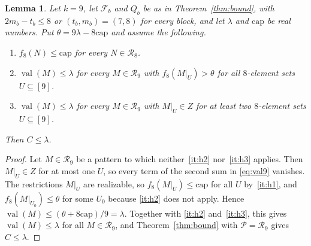 \documentclass[11pt]{amsart}
\newtheorem{lemma}[theorem]{Lemma}
\theoremstyle{definition}
\theoremstyle{remark}
\numberwithin{equation}{section}
\newcommand{\cR}{\mathcal{R}}
\newcommand{\cP}{\mathcal{P}}
\newcommand{\cF}{\mathcal{F}}
\newcommand{\val}{\operatorname{val}}
\newcommand{\capv}{\mathrm{cap}}
\begin{document}
\begin{lemma}\label{lem:hier}
Let $k=9$, let $\cF_b$ and $Q_b$ be as in Theorem~\ref{thm:bound}, with $2m_b-t_b\le8$ or $(t_b,m_b)=(7,8)$ for every block, and let $\lambda$ and $\capv$ be real numbers. Put $\theta=9\lambda-8\capv$ and assume the following.
\begin{enumerate}[label=\textup{(\arabic*)}]
\item\label{it:h1} $f_8(N)\le\capv$ for every $N\in\cR_8$.
\item\label{it:h2} $\val(M)\le\lambda$ for every $M\in\cR_9$ with $f_8(M|_U)>\theta$ for all $8$-element sets $U\subseteq[9]$.
\item\label{it:h3} $\val(M)\le\lambda$ for every $M\in\cR_9$ with $M|_U\in Z$ for at least two $8$-element sets $U\subseteq[9]$.
\end{enumerate}
Then $C\le\lambda$.
\end{lemma}

\begin{proof}
Let $M\in\cR_9$ be a pattern to which neither~\ref{it:h2} nor~\ref{it:h3} applies. Then $M|_U\in Z$ for at most one $U$, so every term of the second sum in \eqref{eq:val9} vanishes. The restrictions $M|_U$ are realizable, so $f_8(M|_U)\le\capv$ for all $U$ by~\ref{it:h1}, and $f_8(M|_{U_0})\le\theta$ for some $U_0$ because \ref{it:h2} does not apply. Hence $\val(M)\le(\theta+8\capv)/9=\lambda$. Together with \ref{it:h2} and~\ref{it:h3}, this gives $\val(M)\le\lambda$ for all $M\in\cR_9$, and Theorem~\ref{thm:bound} with $\cP=\cR_9$ gives $C\le\lambda$.
\end{proof}
\end{document}
